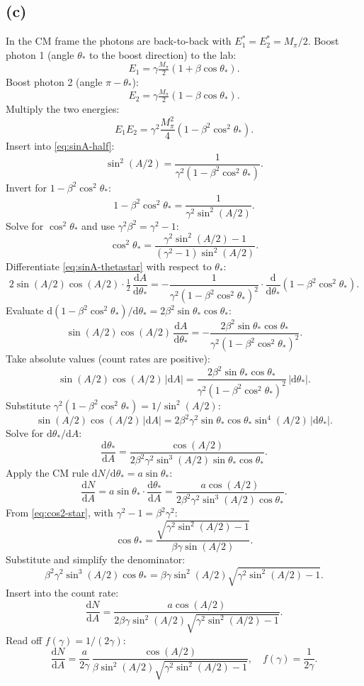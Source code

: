 \documentclass[11pt]{article}
\newcommand{\de}{\mathrm{d}}
\begin{document}
\subsection*{(c)}
In the CM frame the photons are back-to-back with $E^{*}_{1}=E^{*}_{2}=M_{\pi}/2$. Boost photon 1 (angle $\theta_{*}$ to the boost direction) to the lab:
\[ E_{1}=\gamma\tfrac{M_{\pi}}{2}(1+\beta\cos\theta_{*}). \]
Boost photon 2 (angle $\pi-\theta_{*}$):
\[ E_{2}=\gamma\tfrac{M_{\pi}}{2}(1-\beta\cos\theta_{*}). \]
Multiply the two energies:
\[ E_{1}E_{2}=\gamma^{2}\frac{M_{\pi}^{2}}{4}(1-\beta^{2}\cos^{2}\theta_{*}). \]
Insert into \eqref{eq:sinA-half}:
\begin{equation} \sin^{2}(A/2)=\frac{1}{\gamma^{2}(1-\beta^{2}\cos^{2}\theta_{*})}. \label{eq:sinA-thetastar} \end{equation}
Invert for $1-\beta^{2}\cos^{2}\theta_{*}$:
\[ 1-\beta^{2}\cos^{2}\theta_{*}=\frac{1}{\gamma^{2}\sin^{2}(A/2)}. \]
Solve for $\cos^{2}\theta_{*}$ and use $\gamma^{2}\beta^{2}=\gamma^{2}-1$:
\begin{equation} \cos^{2}\theta_{*}=\frac{\gamma^{2}\sin^{2}(A/2)-1}{(\gamma^{2}-1)\sin^{2}(A/2)}. \label{eq:cos2-star} \end{equation}
Differentiate \eqref{eq:sinA-thetastar} with respect to $\theta_{*}$:
\[ 2\sin(A/2)\cos(A/2)\cdot\tfrac{1}{2}\,\frac{\de A}{\de\theta_{*}}=-\frac{1}{\gamma^{2}(1-\beta^{2}\cos^{2}\theta_{*})^{2}}\cdot\frac{\de}{\de\theta_{*}}(1-\beta^{2}\cos^{2}\theta_{*}). \]
Evaluate $\de(1-\beta^{2}\cos^{2}\theta_{*})/\de\theta_{*}=2\beta^{2}\sin\theta_{*}\cos\theta_{*}$:
\[ \sin(A/2)\cos(A/2)\,\frac{\de A}{\de\theta_{*}}=-\frac{2\beta^{2}\sin\theta_{*}\cos\theta_{*}}{\gamma^{2}(1-\beta^{2}\cos^{2}\theta_{*})^{2}}. \]
Take absolute values (count rates are positive):
\[ \sin(A/2)\cos(A/2)\,|\de A|=\frac{2\beta^{2}\sin\theta_{*}\cos\theta_{*}}{\gamma^{2}(1-\beta^{2}\cos^{2}\theta_{*})^{2}}\,|\de\theta_{*}|. \]
Substitute $\gamma^{2}(1-\beta^{2}\cos^{2}\theta_{*})=1/\sin^{2}(A/2)$:
\[ \sin(A/2)\cos(A/2)\,|\de A|=2\beta^{2}\gamma^{2}\sin\theta_{*}\cos\theta_{*}\sin^{4}(A/2)\,|\de\theta_{*}|. \]
Solve for $\de\theta_{*}/\de A$:
\[ \frac{\de\theta_{*}}{\de A}=\frac{\cos(A/2)}{2\beta^{2}\gamma^{2}\sin^{3}(A/2)\sin\theta_{*}\cos\theta_{*}}. \]
Apply the CM rule $\de N/\de\theta_{*}=a\sin\theta_{*}$:
\[ \frac{\de N}{\de A}=a\sin\theta_{*}\cdot\frac{\de\theta_{*}}{\de A}=\frac{a\cos(A/2)}{2\beta^{2}\gamma^{2}\sin^{3}(A/2)\cos\theta_{*}}. \]
From \eqref{eq:cos2-star}, with $\gamma^{2}-1=\beta^{2}\gamma^{2}$:
\[ \cos\theta_{*}=\frac{\sqrt{\gamma^{2}\sin^{2}(A/2)-1}}{\beta\gamma\sin(A/2)}. \]
Substitute and simplify the denominator:
\[ \beta^{2}\gamma^{2}\sin^{3}(A/2)\cos\theta_{*}=\beta\gamma\sin^{2}(A/2)\sqrt{\gamma^{2}\sin^{2}(A/2)-1}. \]
Insert into the count rate:
\[ \frac{\de N}{\de A}=\frac{a\cos(A/2)}{2\beta\gamma\sin^{2}(A/2)\sqrt{\gamma^{2}\sin^{2}(A/2)-1}}. \]
Read off $f(\gamma)=1/(2\gamma)$:
\[ \boxed{\;\frac{\de N}{\de A}=\frac{a}{2\gamma}\,\frac{\cos(A/2)}{\beta\sin^{2}(A/2)\sqrt{\gamma^{2}\sin^{2}(A/2)-1}},\quad f(\gamma)=\frac{1}{2\gamma}.\;} \]
\end{document}
